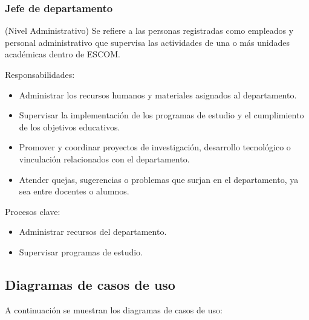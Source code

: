 \begin{Usuario}{\hypertarget{tJefe}{\subsubsection{Jefe de departamento}}}{(Nivel Administrativo)}{
    Se refiere a las personas registradas como empleados y personal administrativo que supervisa las actividades de una o más unidades académicas dentro de ESCOM.
}
\item[Responsabilidades:] \cdtEmpty
\begin{itemize}
        \item Administrar los recursos humanos y materiales asignados al departamento.
        \item Supervisar la implementación de los programas de estudio y el cumplimiento de los objetivos educativos.
        \item Promover y coordinar proyectos de investigación, desarrollo tecnológico o vinculación relacionados con el departamento.
        \item Atender quejas, sugerencias o problemas que surjan en el departamento, ya sea entre docentes o alumnos.
\end{itemize}
    \item[Procesos clave:] \cdtEmpty
    \begin{itemize}
         \item Administrar recursos del departamento.
         \item Supervisar programas de estudio.
    \end{itemize}
\end{Usuario}

\newpage

\subsection{Diagramas de casos de uso}

A continuación se muestran los diagramas de casos de uso:


